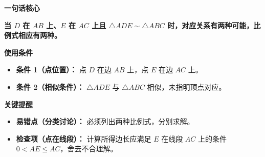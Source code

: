 \begin{summarybox}
	\textbf{\textcolor{CSummary}{一句话核心}}

	\textbf{当 $D$ 在 $AB$ 上、$E$ 在 $AC$ 上且 $\triangle ADE\sim\triangle ABC$ 时，对应关系有两种可能，比例式相应有两种。}

	\medskip
	\textbf{\textcolor{CSummary}{使用条件}}
	\begin{itemize}[leftmargin=*, itemsep=0.5em, topsep=0.4em]
		\item \textbf{条件 1（点位置）：} 点 $D$ 在边 $AB$ 上，点 $E$ 在边 $AC$ 上。
		\item \textbf{条件 2（相似条件）：} $\triangle ADE$ 与 $\triangle ABC$ 相似，未指明顶点对应。
	\end{itemize}

	\medskip
	\textbf{\textcolor{CSummary}{关键提醒}}
	\begin{itemize}[leftmargin=*, itemsep=0.5em, topsep=0.4em]
		\item \textbf{易错点（分类讨论）：} 必须列出两种比例式，分别求解。
		\item \textbf{检查项（点在线段）：} 计算所得边长应满足 $E$ 在线段 $AC$ 上的条件 $0<AE\leq AC$，舍去不合理解。
	\end{itemize}
\end{summarybox}
